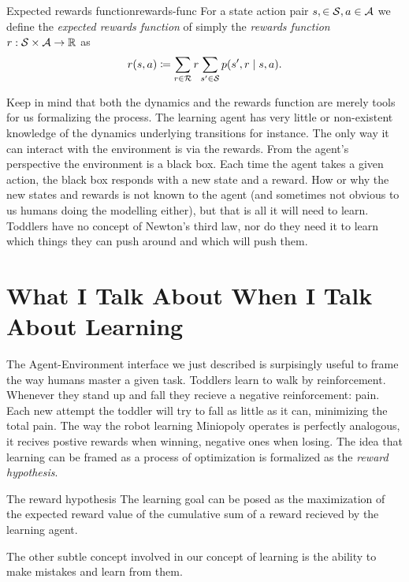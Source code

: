 \begin{dfn}{Expected rewards function}{rewards-func}
	For a state action pair $s, \in \mathcal{S}, a \in \mathcal{A}$ we define the
	\emph{expected rewards function} of simply the \emph{rewards function} $r:
	\mathcal{S} \times \mathcal{A} \to \mathbb{R}$ as
	\begin{equation*}
		r(s, a) \coloneqq \sum_{r \in \mathcal{R}} r \sum_{s' \in \mathcal{S}} p(s', r \mid s, a).
	\end{equation*}
\end{dfn}

Keep in mind that both the dynamics and the rewards function are merely tools
for us formalizing the process. The learning agent has very little or
non-existent knowledge of the dynamics underlying transitions for instance. The
only way it can interact with the environment is via the rewards. From the
agent's perspective the environment is a black box. Each time the agent takes a
given action, the black box responds with a new state and a reward. How or why
the new states and rewards is not known to the agent (and sometimes not obvious
to us humans doing the modelling either), but that is all it will need to learn.
Toddlers have no concept of Newton's third law, nor do they need it to learn
which things they can push around and which will push them.

\section{What I Talk About When I Talk About Learning}
The Agent-Environment interface we just described is surpisingly useful to frame
the way humans master a given task. Toddlers learn to walk by reinforcement.
Whenever they stand up and fall they recieve a negative reinforcement: pain.
Each new attempt the toddler will try to fall as little as it can, minimizing
the total pain. The way the robot learning Miniopoly operates is perfectly
analogous, it recives postive rewards when winning, negative ones when losing.
The idea that learning can be framed as a process of optimization is formalized
as the \emph{reward hypothesis}.

\begin{remark}{The reward hypothesis}
	The learning goal can be posed as the maximization of the expected reward
	value of the cumulative sum of a reward recieved by the learning agent. 
\end{remark}

The other subtle concept involved in our concept of learning is the
ability to make mistakes and learn from them.

